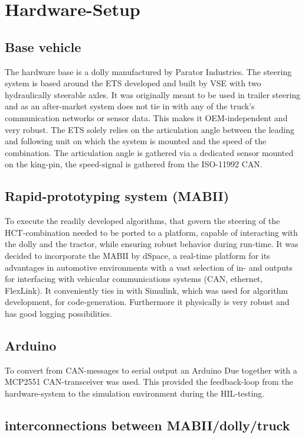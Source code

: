 \documentclass[root.tex]{subfiles}
\begin{document}
{\pagestyle{empty}}
\section{Hardware-Setup}
\label{chap:Hardware-Setup}
\subsection{Base vehicle}

The hardware base is a dolly manufactured by Parator Industries. The steering system is based around the \gls{ETS} developed and built by \gls{VSE} with two hydraulically steerable axles. It was originally meant to be used in trailer steering and as an after-market system does not tie in with any of the truck's communication networks or sensor data. This makes it OEM-independent and very robust. The \gls{ETS} solely relies on the articulation angle between the leading and following unit on which the system is mounted and the speed of the combination. The articulation angle is gathered via a dedicated sensor mounted on the king-pin, the speed-signal is gathered from the ISO-11992 \gls{CAN}.

\subsection{Rapid-prototyping system (\gls{MABII})}

To execute the readily developed algorithms\cite{c27}, that govern the steering of the \gls{HCT}-combination needed to be ported to a platform, capable of interacting with the dolly and the tractor, while ensuring robust behavior during run-time. It was decided to incorporate the \gls{MABII} by dSpace, a real-time platform for its advantages in automotive environments with a vast selection of in- and outputs for interfacing with vehicular communications systems (\gls{CAN}, ethernet, FlexLink). It conveniently ties in with Simulink, which was used for algorithm development, for code-generation. Furthermore it physically is very robust and has good logging possibilities.


\subsection{Arduino}

To convert from \gls{CAN}-messages to serial output an Arduino Due together with a MCP2551 \gls{CAN}-transceiver was used. This provided the feedback-loop from the hardware-system to the simulation environment during the \gls{HIL}-testing.

\subsection{interconnections between MABII/dolly/truck}
\end{document}
